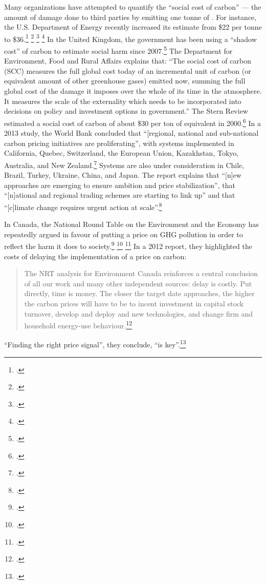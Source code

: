 Many organizations have attempted to quantify the ``social cost of carbon'' --- the amount of damage done to third parties by emitting one tonne of .
For instance, the U.S. Department of Energy recently increased its estimate from \$22 per tonne to \$36.\footcite[][]{DOE22to36} \footcite[][]{WHStrengthened} \footcite[See also: ][]{NewSocialCostEffort} \footcite[][]{CBCUSSocialCost}
In the United Kingdom, the government has been using a ``shadow cost'' of carbon to estimate social harm since 2007.\footcite[][]{DEFRAShadowCost}
The Department for Environment, Food and Rural Affairs explains that: ``The social cost of carbon (SCC) measures the full global cost today of an incremental unit of carbon (or equivalent amount of other greenhouse gases) emitted now, summing the full global cost of the damage it imposes over the whole of its time in the atmosphere. It measures the scale of the externality which needs to be incorporated into decisions on policy and investment options in government.''
The Stern Review estimated a social cost of carbon of about \$30 per ton of  equivalent in 2000.\footcite[][]{Stern2007}
In a 2013 study, the World Bank concluded that ``[regional, national and sub-national carbon pricing initiatives are proliferating'', with systems implemented in California, Quebec, Switzerland, the European Union, Kazakhstan, Tokyo, Australia, and New Zealand.\footcite[][p. 11]{WorldBankCarbonPricing}
Systems are also under consideration in Chile, Brazil, Turkey, Ukraine, China, and Japan.
The report explains that ``[n]ew approaches are emerging to ensure ambition and price stabilization'', that ``[n]ational and regional trading schemes are starting to link up'' and that ``[c]limate change requires urgent action at scale''.\footcite[][p. 12--13]{WorldBankCarbonPricing}



In Canada, the National Round Table on the Environment and the Economy has repeatedly argued in favour of putting a price on GHG pollution in order to reflect the harm it does to society.\footcite[See: ][]{Achieving2050} \footcite[][]{Achieving2050Outreach} \footcite[][p. 18]{FramingFuture}
In a 2012 report, they highlighted the costs of delaying the implementation of a price on carbon:
\begin{quote}
The NRT analysis for Environment Canada reinforces a central conclusion of all our work and many other independent sources: delay is costly. Put directly, time is money. The closer the target date approaches, the higher the carbon prices will have to be to incent investment in capital stock turnover, develop and deploy and new technologies, and change firm and household energy-use behaviour.\footcite[][p. 114]{RealityCheck2012}
\end{quote}
``Finding the right price signal'', they conclude, ``is key''.\footcite[][p. 117]{RealityCheck2012}




